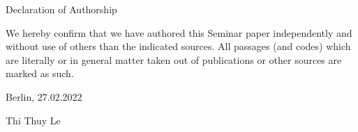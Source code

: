 \documentclass{article}
\begin{document}
Declaration of Authorship

We hereby confirm that we have authored this Seminar paper independently and without use of others than the indicated sources. All passages (and codes) which are literally or in general matter taken out of publications or other sources are marked as such.

Berlin, 27.02.2022
\vspace{3cm}


Thi Thuy Le
\end{document}
